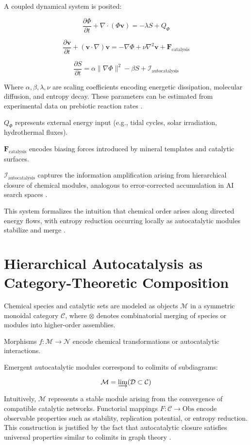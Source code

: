 \documentclass{book}
\begin{document}
A coupled dynamical system is posited:

\[\frac{\partial \Phi}{\partial t} + \nabla \cdot (\Phi \mathbf{v}) = - \lambda S + Q_\Phi\]

\[\frac{\partial \mathbf{v}}{\partial t} + (\mathbf{v} \cdot \nabla) \mathbf{v} = - \nabla \Phi + \nu \nabla^2 \mathbf{v} + \mathbf{F}_{\text{catalysis}}\]

\[\frac{\partial S}{\partial t} = \alpha \|\nabla \Phi\|^2 - \beta S + \mathcal{I}_{\text{autocatalysis}}\]

Where $\alpha, \beta, \lambda, \nu$ are scaling coefficients encoding energetic dissipation, molecular diffusion, and entropy decay. These parameters can be estimated from experimental data on prebiotic reaction rates \citep{sokolskyi2024, matreux2024}.

$Q_\Phi$ represents external energy input (e.g., tidal cycles, solar irradiation, hydrothermal fluxes).

$\mathbf{F}_{\text{catalysis}}$ encodes biasing forces introduced by mineral templates and catalytic surfaces.

$\mathcal{I}_{\text{autocatalysis}}$ captures the information amplification arising from hierarchical closure of chemical modules, analogous to error-corrected accumulation in AI search spaces \citep{scalinghypothesis}.

This system formalizes the intuition that chemical order arises along directed energy flows, with entropy reduction occurring locally as autocatalytic modules stabilize and merge \citep{peng2022}.

\section{Hierarchical Autocatalysis as Category-Theoretic Composition}
Chemical species and catalytic sets are modeled as objects $\mathcal{M}$ in a symmetric monoidal category $\mathcal{C}$, where $\otimes$ denotes combinatorial merging of species or modules into higher-order assemblies.

Morphisms $f: \mathcal{M} \to \mathcal{N}$ encode chemical transformations or autocatalytic interactions.

Emergent autocatalytic modules correspond to colimits of subdiagrams:

\[\mathcal{M} = \varinjlim (\mathcal{D} \subset \mathcal{C})\]

Intuitively, $\mathcal{M}$ represents a stable module arising from the convergence of compatible catalytic networks. Functorial mappings $F: \mathcal{C} \to \mathrm{Obs}$ encode observable properties such as stability, replication potential, or entropy reduction. This construction is justified by the fact that autocatalytic closure satisfies universal properties similar to colimits in graph theory \citep{hordijk2010, virgo2013}.
\end{document}
